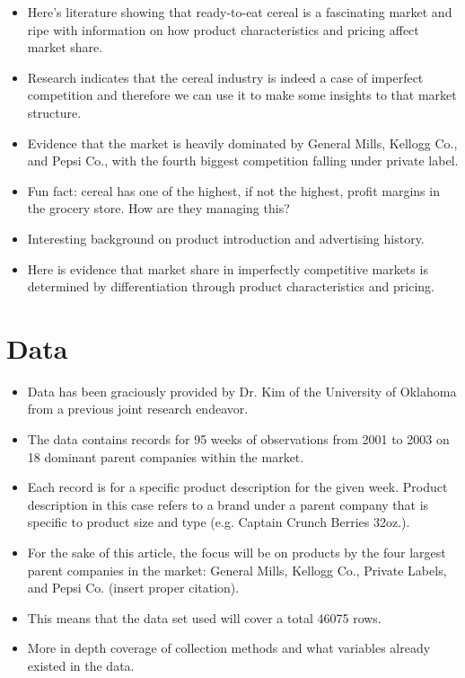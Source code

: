 \documentclass[12pt,english]{article}
\begin{document}
\begin{itemize}
    \item Here's literature showing that ready-to-eat cereal is a fascinating market and ripe with information on how product characteristics and pricing affect market share.
    \item Research indicates that the cereal industry is indeed a case of imperfect competition and therefore we can use it to make some insights to that market structure.
    \item Evidence that the market is heavily dominated by General Mills, Kellogg Co., and Pepsi Co., with the fourth biggest competition falling under private label.
    \item Fun fact: cereal has one of the highest, if not the highest, profit margins in the grocery store. How are they managing this?
    \item Interesting background on product introduction and advertising history.
    \item Here is evidence that market share in imperfectly competitive markets is determined by differentiation through product characteristics and pricing.
\end{itemize}

\section{Data}

\begin{itemize}
    \item Data has been graciously provided by Dr. Kim of the University of Oklahoma from a previous joint research endeavor.
    \item The data contains records for 95 weeks of observations from 2001 to 2003 on 18 dominant parent companies within the market.
    \item Each record is for a specific product description for the given week. Product description in this case refers to a brand under a parent company that is specific to product size and type (e.g. Captain Crunch Berries 32oz.). 
    \item For the sake of this article, the focus will be on products by the four largest parent companies in the market: General Mills, Kellogg Co., Private Labels, and Pepsi Co. (insert proper citation).
    \item This means that the data set used will cover a total 46075 rows.
    \item More in depth coverage of collection methods and what variables already existed in the data.
   
\end{itemize}
\end{document}
